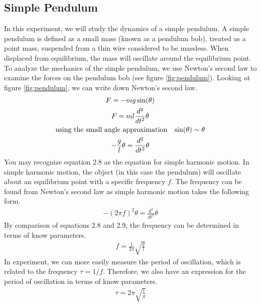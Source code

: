 \subsection{Simple Pendulum}
In this experiment, we will study the dynamics of a simple pendulum. A simple pendulum is defined as a small mass (known as a pendulum bob), treated as a point mass, suspended from a thin wire considered to be massless. When displaced from equilibrium, the mass will oscillate around the equilibrium point. To analyze the mechanics of the simple pendulum, we use Newton's second law to examine the forces on the pendulum bob (see figure \ref{fig:pendulum}).
\myskip
Looking at figure \ref{fig:pendulum}, we can write down Newton's second law.
\begin{gather}
F = -mg\sin(\theta) \\
F = ml \frac{d^2}{dt^2}\theta \\
\text{using the small angle approximation} \hspace{3mm} \sin(\theta) \sim \theta \nonumber \\
-\frac{g}{l} \theta = \frac{d^2}{dt^2}\theta
\end{gather}
You may recognize equation 2.8 as the equation for simple harmonic motion. In simple harmonic motion, the object (in this case the pendulum) will oscillate about an equilibrium point with a specific frequency $f$. The frequency can be found from Newton's second law as simple harmonic motion takes the following form.
\begin{gather}
-(2\pi f)^2 \theta = \frac{d^2}{dt^2}\theta
\end{gather}
By comparison of equations 2.8 and 2.9, the frequency can be determined in terms of know parameters.
\begin{gather}
f = \frac{1}{2\pi}\sqrt{\frac{g}{l}}
\end{gather}
In experiment, we can more easily measure the period of oscillation, which is related to the frequency $\tau = 1/f$. Therefore, we also have an expression for the period of oscillation in terms of know parameters.
\begin{gather}
\tau=2\pi \sqrt{\frac{l}{g}}
\end{gather}

